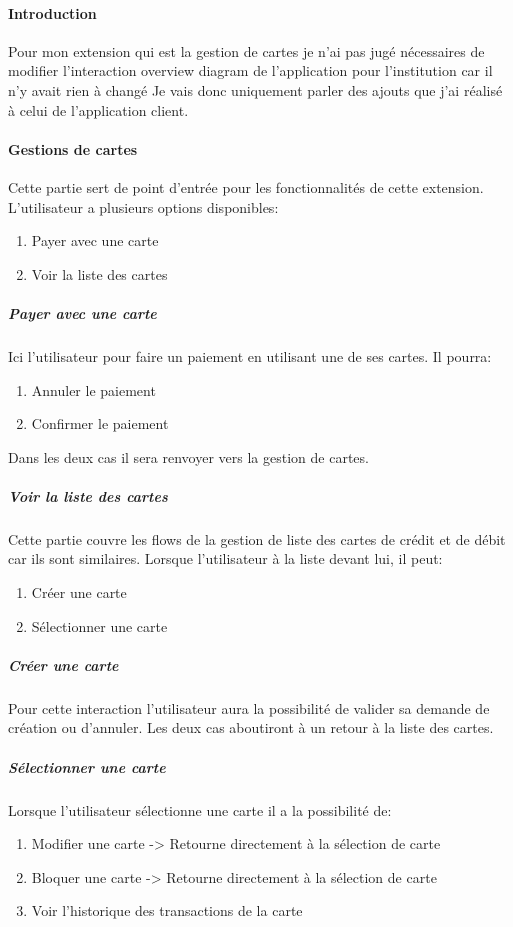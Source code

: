 \documentclass{article}
\begin{document}
\paragraph{Introduction}
Pour mon extension qui est la gestion de cartes je n'ai pas jugé nécessaires de modifier
l'interaction overview diagram de l'application pour l'institution car il n'y avait rien à changé
Je vais donc uniquement parler des ajouts que j'ai réalisé à celui de l'application client.

\paragraph{Gestions de cartes}
Cette partie sert de point d'entrée pour les fonctionnalités de cette extension.
L'utilisateur a plusieurs options disponibles:
\begin{enumerate}
    \item Payer avec une carte
    \item Voir la liste des cartes
\end{enumerate}

\subparagraph{Payer avec une carte}
Ici l'utilisateur pour faire un paiement en utilisant une de ses cartes. Il pourra:
\begin{enumerate}
    \item Annuler le paiement
    \item Confirmer le paiement
\end{enumerate}

Dans les deux cas il sera renvoyer vers la gestion de cartes.

\subparagraph{Voir la liste des cartes}
Cette partie couvre les flows de la gestion de liste des cartes de crédit et de débit
car ils sont similaires. Lorsque l'utilisateur à la liste devant lui, il peut:

\begin{enumerate}
    \item Créer une carte
    \item Sélectionner une carte
\end{enumerate}

\subparagraph{Créer une carte}
Pour cette interaction l'utilisateur aura la possibilité de valider sa demande de création ou
d'annuler. Les deux cas aboutiront à un retour à la liste des cartes.
\subparagraph{Sélectionner une carte}
Lorsque l'utilisateur sélectionne une carte il a la possibilité de:
\begin{enumerate}
    \item Modifier une carte -> Retourne directement à la sélection de carte
    \item Bloquer une carte -> Retourne directement à la sélection de carte
    \item Voir l'historique des transactions de la carte
\end{enumerate}
\end{document}
